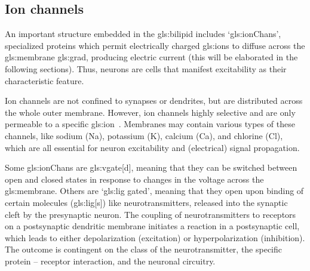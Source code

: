 \documentclass[class={myRUCProject}, crop=false]{standalone}
\begin{document}
\subsection{Ion channels}

An important structure embedded in the \gls{gls:bilipid} includes `\glspl{gls:ionChan}', specialized proteins which permit electrically charged \glspl{gls:ion} to diffuse across the \gls{gls:membrane} \gls{gls:grad}, producing electric current (this will be elaborated in the following sections). Thus, neurons are cells that manifest excitability as their characteristic feature. 

Ion channels are not confined to synapses or dendrites, but are distributed across the whole outer membrane. However, ion channels highly selective and are only permeable to a specific \gls{gls:ion}~\cite{Hammond2015ch4}. Membranes may  contain various types of these channels,  like sodium (\gls{Na}), potassium (\gls{K}), calcium (\gls{Ca}), and chlorine (\gls{Cl}), which are all essential for neuron excitability and  (electrical) signal propagation.


Some \glspl{gls:ionChan} are \gls{gls:vgate}[d], meaning that they can be switched between open and closed states in response to changes in the voltage across the \gls{gls:membrane}. 
Others are `\gls{gls:lig} gated', meaning that they  open upon binding of certain molecules (\gls{gls:lig}[s]) like neurotransmitters, released into the synaptic cleft by the presynaptic neuron. The coupling of neurotransmitters to receptors on a postsynaptic dendritic membrane initiates a reaction in a postsynaptic cell, which leads to either depolarization (excitation) or hyperpolarization (inhibition). The outcome is contingent on the class of the neurotransmitter, the specific protein – receptor interaction, and the neuronal circuitry.

\end{document}
